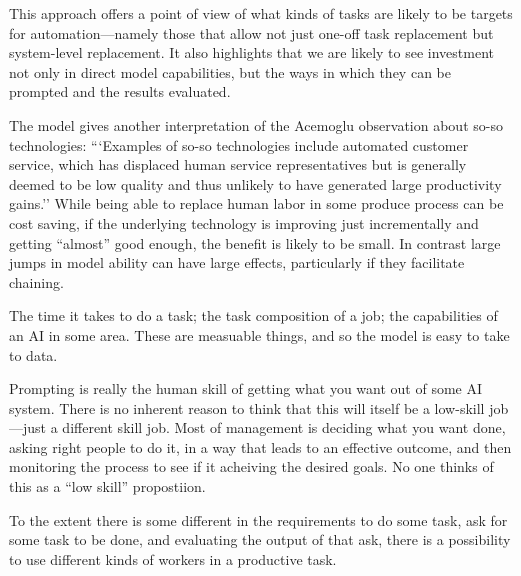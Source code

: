 \documentclass{article}
\begin{document}
This approach offers a point of view of what kinds of tasks are likely to be targets for automation---namely those that allow not just one-off task replacement but system-level replacement.
It also highlights that we are likely to see investment not only in direct model capabilities, but the ways in which they can be prompted and the results evaluated. 

The model gives another interpretation of the Acemoglu observation about so-so technologies: ```Examples of so-so technologies include automated customer service, which has displaced human service representatives but is generally deemed to be low quality and thus unlikely to have generated large productivity gains.''
While being able to replace human labor in some produce process can be cost saving, if the underlying technology is improving just incrementally and getting ``almost'' good enough, the benefit is likely to be small.
In contrast large jumps in model ability can have large effects, particularly if they facilitate chaining.

The time it takes to do a task; the task composition of a job; the capabilities of an AI in some area.
These are measuable things, and so the model is easy to take to data. 

Prompting is really the human skill of getting what you want out of some AI system.
There is no inherent reason to think that this will itself be a low-skill job---just a different skill job.
Most of management is deciding what you want done, asking right people to do it, in a way that leads to an effective outcome, and then monitoring the process to see if it acheiving the desired goals.
No one thinks of this as a ``low skill'' propostiion.


To the extent there is some different in the requirements to do some task, ask for some task to be done, and evaluating the output of that ask, there is a possibility to use different kinds of workers in a productive task.
\end{document}

